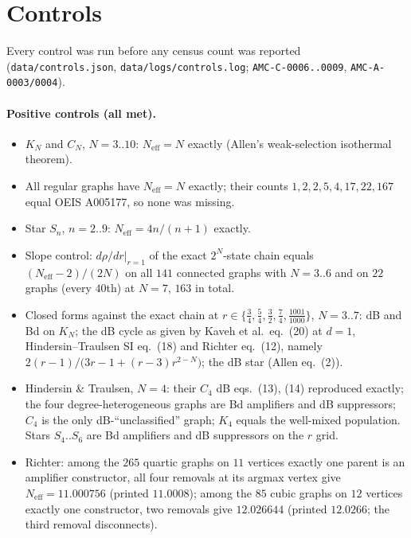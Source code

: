 \documentclass[10pt]{article}
\newcommand{\Neff}{N_{\mathrm{eff}}}
\begin{document}
\section{Controls}\label{sec:controls}
Every control was run before any census count was reported (\texttt{data/controls.json}, \texttt{data/logs/controls.log}; \texttt{AMC-C-0006..0009}, \texttt{AMC-A-0003/0004}).
\paragraph{Positive controls (all met).}
\begin{itemize}\itemsep=0pt
\item $K_N$ and $C_N$, $N=3..10$: $\Neff=N$ exactly (Allen's weak-selection isothermal theorem).
\item All regular graphs have $\Neff=N$ exactly; their counts $1,2,2,5,4,17,22,167$ equal OEIS A005177, so none was missing.
\item Star $S_n$, $n=2..9$: $\Neff=4n/(n+1)$ exactly.
\item Slope control: $d\rho/dr|_{r=1}$ of the exact $2^N$-state chain equals $(\Neff-2)/(2N)$ on all $141$ connected graphs with $N=3..6$ and on $22$ graphs (every $40$th) at $N=7$, $163$ in total.
\item Closed forms against the exact chain at $r\in\{\tfrac34,\tfrac54,\tfrac32,\tfrac74,\tfrac{1001}{1000}\}$, $N=3..7$: dB and Bd on $K_N$; the dB cycle as given by Kaveh et al.\ eq.~(20) at $d=1$, Hindersin--Traulsen SI eq.~(18) and Richter eq.~(12), namely $2(r-1)/\bigl(3r-1+(r-3)r^{2-N}\bigr)$; the dB star (Allen eq.~(2)).
\item Hindersin \& Traulsen, $N=4$: their $C_4$ dB eqs.~(13), (14) reproduced exactly; the four degree-heterogeneous graphs are Bd amplifiers and dB suppressors; $C_4$ is the only dB-``unclassified'' graph; $K_4$ equals the well-mixed population. Stars $S_4..S_6$ are Bd amplifiers and dB suppressors on the $r$ grid.
\item Richter: among the $265$ quartic graphs on $11$ vertices exactly one parent is an amplifier constructor, all four removals at its argmax vertex give $\Neff=11.000756$ (printed $11.0008$); among the $85$ cubic graphs on $12$ vertices exactly one constructor, two removals give $12.026644$ (printed $12.0266$; the third removal disconnects).
\end{itemize}
\end{document}
